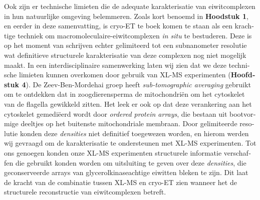 \begin{otherlanguage}{dutch}
    Ook zijn er technische limieten die de adequate karakterisatie van eiwitcomplexen in hun natuurlijke omgeving belemmeren. Zoals kort benoemd in \textbf{Hoodstuk 1}, en eerder in deze samenvatting, is cryo-ET te boek komen te staan als een krachtige techniek om macromoleculaire-eiwitcomplexen \emph{in situ} te bestuderen. Deze is op het moment van schrijven echter gelimiteerd tot een subnanometer resolutie wat definitieve structurele karakterisatie van deze complexen nog niet mogelijk maakt. In een interdisciplinaire samenwerking laten wij zien dat we deze technische limieten kunnen overkomen door gebruik van XL-MS experimenten (\textbf{Hoofdstuk 4}). De Zeev-Ben-Mordehai groep heeft \emph{sub-tomographic averaging} gebruikt om te ontdekken dat in zoogdierensperma de mitochondriën om het cytoskelet van de flagella gewikkeld zitten. Het leek er ook op dat deze verankering aan het cytoskelet gemediëerd wordt door \emph{ordered protein arrays}, die bestaan uit bootvormige deeltjes op het buitenste mitochondriale membraan. Door gelimiteerde resolutie konden deze \emph{densities} niet definitief toegewezen worden, en hierom werden wij gevraagd om de karakterisatie te ondersteunen met XL-MS experimenten. Tot ons genoegen konden onze XL-MS experimenten structurele informatie verschaffen die gebruikt konden worden om uitsluiting te geven over deze \emph{densities}, die geconserveerde arrays van glycerolkinaseachtige eiwitten bleken te zijn. Dit laat de kracht van de combinatie tussen XL-MS en cryo-ET zien wanneer het de structurele reconstructie van eiwitcomplexen betreft.


\end{otherlanguage}
